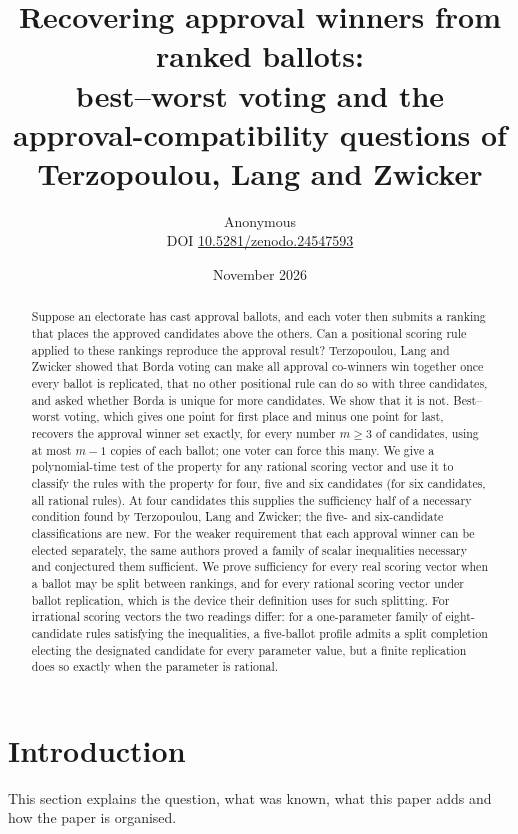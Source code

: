 \documentclass[11pt,a4paper]{article}
\title{Recovering approval winners from ranked ballots:\\[2pt]
\large best--worst voting and the approval-compatibility questions of Terzopoulou, Lang and Zwicker}
\author{Anonymous\\[3pt]{\small DOI \href{https://doi.org/10.5281/zenodo.24547593}{10.5281/zenodo.24547593}}}
\date{November 2026}
\theoremstyle{definition}
\theoremstyle{remark}
\begin{document}
\maketitle
\begin{abstract}
Suppose an electorate has cast approval ballots, and each voter then submits a ranking that places the approved candidates above the others. Can a positional scoring rule applied to these rankings reproduce the approval result? Terzopoulou, Lang and Zwicker showed that Borda voting can make all approval co-winners win together once every ballot is replicated, that no other positional rule can do so with three candidates, and asked whether Borda is unique for more candidates. We show that it is not. Best--worst voting, which gives one point for first place and minus one point for last, recovers the approval winner set exactly, for every number $m\ge3$ of candidates, using at most $m-1$ copies of each ballot; one voter can force this many. We give a polynomial-time test of the property for any rational scoring vector and use it to classify the rules with the property for four, five and six candidates (for six candidates, all rational rules). At four candidates this supplies the sufficiency half of a necessary condition found by Terzopoulou, Lang and Zwicker; the five- and six-candidate classifications are new. For the weaker requirement that each approval winner can be elected separately, the same authors proved a family of scalar inequalities necessary and conjectured them sufficient. We prove sufficiency for every real scoring vector when a ballot may be split between rankings, and for every rational scoring vector under ballot replication, which is the device their definition uses for such splitting. For irrational scoring vectors the two readings differ: for a one-parameter family of eight-candidate rules satisfying the inequalities, a five-ballot profile admits a split completion electing the designated candidate for every parameter value, but a finite replication does so exactly when the parameter is rational.
\end{abstract}

\section{Introduction}\label{sec:intro}
This section explains the question, what was known, what this paper adds and how the paper is organised.
\end{document}
